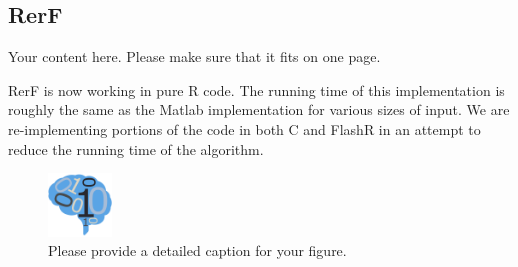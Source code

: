 \documentclass[simplex.tex]{subfiles}
\begin{document}
\subsection{RerF}


Your content here. Please make sure that it fits on one page.

RerF is now working in pure R code.  The running time of this implementation is roughly the same as the Matlab implementation for various sizes of input.  We are re-implementing portions of the code in both C and FlashR in an attempt to reduce the running time of the algorithm.

\begin{figure}[!h]
\begin{cframed}
\centering
\includegraphics[width=0.15\textwidth]{neurodata_small.png}
\caption{Please provide a detailed caption for your figure.}
\label{fig:name}
\end{cframed}
\end{figure}
\clearpage
\end{document}
